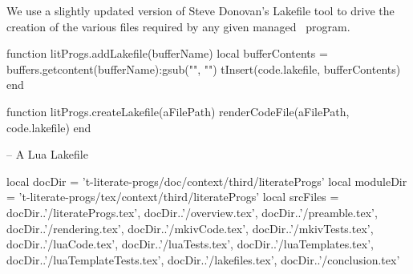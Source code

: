 
\startchapter[title=Lakefile]

We use a slightly updated version of Steve Donovan's Lakefile tool to 
drive the creation of the various files required by any given 
 managed \ConTeXt\ program. 

\startMkIVCode



\setuptyping[Lakefile][option=lua]


\let\oldStopLakefile=\stopLakefile
\def\stopLakefile{%
  \oldStopLakefile%
  \directlua{thirddata.literateProgs.addLakefile('_typing_')}}


\def\createLakefile[#1]{
  \directlua{thirddata.literateProgs.createLakefile('#1')}
}

\stopMkIVCode

\startLuaCode

function litProgs.addLakefile(bufferName)
  local bufferContents = buffers.getcontent(bufferName):gsub("", "\n")
  tInsert(code.lakefile, bufferContents)
end

function litProgs.createLakefile(aFilePath)
  renderCodeFile(aFilePath, code.lakefile)
end

\stopLuaCode

\startLakefile
-- A Lua Lakefile

local docDir    =
  't-literate-progs/doc/context/third/literateProgs'
local moduleDir =
  't-literate-progs/tex/context/third/literateProgs'
local srcFiles = {
  docDir..'/literateProgs.tex',
  docDir..'/overview.tex',
  docDir..'/preamble.tex',
  docDir..'/rendering.tex',
  docDir..'/mkivCode.tex',
  docDir..'/mkivTests.tex',
  docDir..'/luaCode.tex',
  docDir..'/luaTests.tex',
  docDir..'/luaTemplates.tex',
  docDir..'/luaTemplateTests.tex',
  docDir..'/lakefiles.tex',
  docDir..'/conclusion.tex'
}

